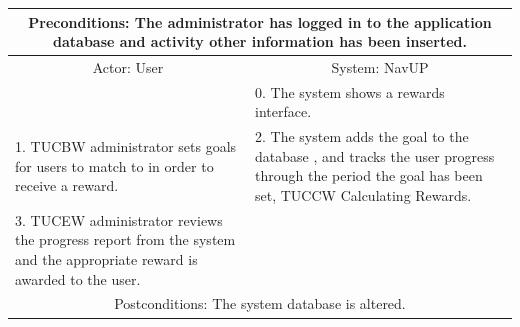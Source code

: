 \documentclass{article}
\begin{document}
        		\centering		
       		 \small
       		 \begin{tabular}{|p{6cm}|p{6cm}|}
       		 \hline
       		\multicolumn{2}{c}{\parbox{12cm}{\vspace{2mm} Preconditions: The administrator has logged in to the application database and activity other information has been inserted.\vspace{2mm}}} \\
       		 \hline
       		\multicolumn{1}{c}{Actor: User} & \multicolumn{1}{c}{ System: NavUP} \\
        		\hline
       		 &0.	The system shows a rewards interface.\\
       		 \hline
       		1.	TUCBW administrator sets goals for users to match to in order to receive a reward.
 &2.	The system adds the goal to the database , and tracks the user progress through the period the goal has been set, TUCCW Calculating Rewards.
\\
        		\hline
       		3.	TUCEW administrator reviews the progress report from the system and the appropriate reward is awarded to the user.&\\
       		 \hline
        		\multicolumn{2}{c}{Postconditions: The system database is altered. } \\
        		\hline
        \end{tabular} 
     
\end{document}
